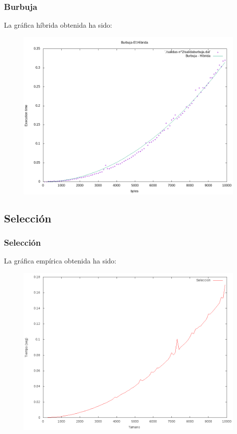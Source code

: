 \documentclass{beamer}
\begin{document}
\begin{frame}
	\frametitle{Burbuja}
	La gráfica híbrida obtenida ha sido:
	\begin{figure}
		\centering
		\includegraphics[width=0.7\linewidth]{imagenes/burbuja-hibrida.png}
		\caption{}
		\label{fig:E3}
	\end{figure}	
\end{frame}





\subsection{Selección}
\begin{frame}
	\frametitle{Selección}
	La gráfica empírica obtenida ha sido:
	\begin{figure}
		\centering
		\includegraphics[width=0.7\linewidth]{imagenes/seleccionLines.png}
		\caption{}
		\label{fig:E4}
	\end{figure}
	
\end{frame}
\end{document}
